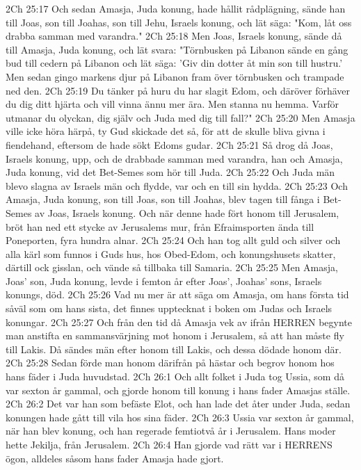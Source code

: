 2Ch 25:17  Och sedan Amasja, Juda konung, hade hållit rådplägning, sände han till Joas, son till Joahas, son till Jehu, Israels konung, och lät säga: "Kom, låt oss drabba samman med varandra."
2Ch 25:18  Men Joas, Israels konung, sände då till Amasja, Juda konung, och lät svara: "Törnbusken på Libanon sände en gång bud till cedern på Libanon och lät säga: 'Giv din dotter åt min son till hustru.' Men sedan gingo markens djur på Libanon fram över törnbusken och trampade ned den.
2Ch 25:19  Du tänker på huru du har slagit Edom, och däröver förhäver du dig ditt hjärta och vill vinna ännu mer ära. Men stanna nu hemma. Varför utmanar du olyckan, dig själv och Juda med dig till fall?"
2Ch 25:20  Men Amasja ville icke höra härpå, ty Gud skickade det så, för att de skulle bliva givna i fiendehand, eftersom de hade sökt Edoms gudar.
2Ch 25:21  Så drog då Joas, Israels konung, upp, och de drabbade samman med varandra, han och Amasja, Juda konung, vid det Bet-Semes som hör till Juda.
2Ch 25:22  Och Juda män blevo slagna av Israels män och flydde, var och en till sin hydda.
2Ch 25:23  Och Amasja, Juda konung, son till Joas, son till Joahas, blev tagen till fånga i Bet-Semes av Joas, Israels konung. Och när denne hade fört honom till Jerusalem, bröt han ned ett stycke av Jerusalems mur, från Efraimsporten ända till Poneporten, fyra hundra alnar.
2Ch 25:24  Och han tog allt guld och silver och alla kärl som funnos i Guds hus, hos Obed-Edom, och konungshusets skatter, därtill ock gisslan, och vände så tillbaka till Samaria.
2Ch 25:25  Men Amasja, Joas' son, Juda konung, levde i femton år efter Joas', Joahas' sons, Israels konungs, död.
2Ch 25:26  Vad nu mer är att säga om Amasja, om hans första tid såväl som om hans sista, det finnes upptecknat i boken om Judas och Israels konungar.
2Ch 25:27  Och från den tid då Amasja vek av ifrån HERREN begynte man anstifta en sammansvärjning mot honom i Jerusalem, så att han måste fly till Lakis. Då sändes män efter honom till Lakis, och dessa dödade honom där.
2Ch 25:28  Sedan förde man honom därifrån på hästar och begrov honom hos hans fäder i Juda huvudstad.
2Ch 26:1  Och allt folket i Juda tog Ussia, som då var sexton år gammal, och gjorde honom till konung i hans fader Amasjas ställe.
2Ch 26:2  Det var han som befäste Elot, och han lade det åter under Juda, sedan konungen hade gått till vila hos sina fäder.
2Ch 26:3  Ussia var sexton år gammal, när han blev konung, och han regerade femtiotvå år i Jerusalem. Hans moder hette Jekilja, från Jerusalem.
2Ch 26:4  Han gjorde vad rätt var i HERRENS ögon, alldeles såsom hans fader Amasja hade gjort.
